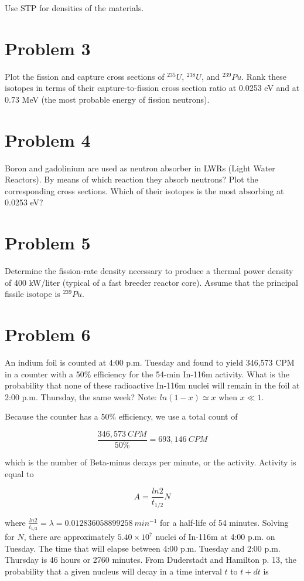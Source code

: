 \documentclass{article}
\begin{document}
Use STP for densities of the materials.

\section*{Problem 3}

Plot the fission and capture cross sections of $^{235}U$, $^{238}U$, and $^{239}Pu$. Rank these isotopes in
terms of their capture-to-fission cross section ratio at 0.0253 eV and at 0.73 MeV (the most
probable energy of fission neutrons).

\section*{Problem 4}

Boron and gadolinium are used as neutron absorber in LWRs (Light Water Reactors). By
means of which reaction they absorb neutrons? Plot the corresponding cross sections. Which
of their isotopes is the most absorbing at 0.0253 eV?

\section*{Problem 5}

Determine the fission-rate density necessary to produce a thermal power density of 400 kW/liter
(typical of a fast breeder reactor core). Assume that the principal fissile isotope is $^{239}Pu$.

\section*{Problem 6}

An indium foil is counted at 4:00 p.m. Tuesday and found to yield 346,573 CPM in a counter
with a 50$\%$ efficiency for the 54-min In-116m activity. What is the probability that none of
these radioactive In-116m nuclei will remain in the foil at 2:00 p.m. Thursday, the same week?
Note: $ln (1- x) \simeq x $ when $ x \ll 1$.

\hrulefill


Because the counter has a 50$\%$ efficiency, we use a total count of

$$\frac{346,573~CPM}{50\%} = 693,146~CPM$$

which is the number of Beta-minus decays per minute, or the activity. Activity is equal to

$$\mathit{A} = \frac{ln2}{t_{1/2}}N$$

where $\frac{ln2}{t_{1/2}} = \lambda = 0.012836058899258~min^{-1}$ for a half-life of 54 minutes. Solving for $N$, there are approximately $5.40 \times 10^{7}$ nuclei of In-116m at 4:00 p.m. on Tuesday. The time that will elapse between 4:00 p.m. Tuesday and 2:00 p.m. Thursday is 46 hours or 2760 minutes. From Duderstadt and Hamilton p. 13, the probability that a given nucleus will decay in a time interval $t$ to $t + dt$ is
\end{document}
